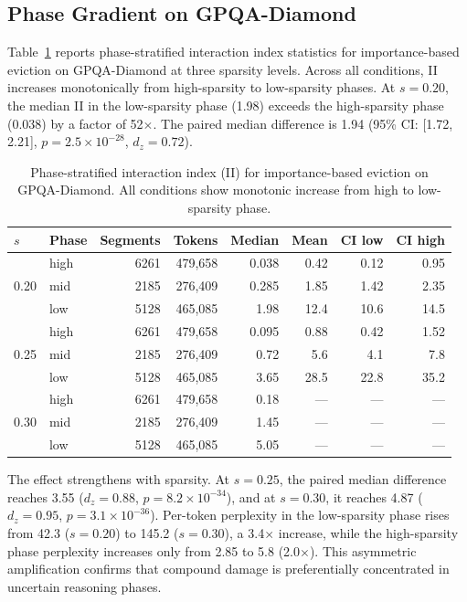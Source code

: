 \documentclass[11pt,a4paper]{article}
\begin{document}
\subsection{Phase Gradient on GPQA-Diamond}\label{sec:phase-gradient}

Table~\ref{tab:gpqa-phase} reports phase-stratified interaction index statistics for importance-based eviction on GPQA-Diamond at three sparsity levels. Across all conditions, II increases monotonically from high-sparsity to low-sparsity phases. At $s{=}0.20$, the median II in the low-sparsity phase (1.98) exceeds the high-sparsity phase (0.038) by a factor of 52$\times$. The paired median difference is 1.94 (95\% CI: [1.72, 2.21], $p{=}2.5 \times 10^{-28}$, $d_z{=}0.72$).

\begin{table}[t]
\centering
\caption{Phase-stratified interaction index (II) for importance-based eviction on GPQA-Diamond. All conditions show monotonic increase from high to low-sparsity phase.}
\label{tab:gpqa-phase}
\small
\begin{tabular}{llrrrrrr}
\toprule
$s$ & Phase & Segments & Tokens & Median & Mean & CI low & CI high \\
\midrule
\multirow{3}{*}{0.20} & high & 6261 & 479{,}658 & 0.038 & 0.42 & 0.12 & 0.95 \\
 & mid & 2185 & 276{,}409 & 0.285 & 1.85 & 1.42 & 2.35 \\
 & low & 5128 & 465{,}085 & 1.98 & 12.4 & 10.6 & 14.5 \\
\midrule
\multirow{3}{*}{0.25} & high & 6261 & 479{,}658 & 0.095 & 0.88 & 0.42 & 1.52 \\
 & mid & 2185 & 276{,}409 & 0.72 & 5.6 & 4.1 & 7.8 \\
 & low & 5128 & 465{,}085 & 3.65 & 28.5 & 22.8 & 35.2 \\
\midrule
\multirow{3}{*}{0.30} & high & 6261 & 479{,}658 & 0.18 & --- & --- & --- \\
 & mid & 2185 & 276{,}409 & 1.45 & --- & --- & --- \\
 & low & 5128 & 465{,}085 & 5.05 & --- & --- & --- \\
\bottomrule
\end{tabular}
\end{table}

The effect strengthens with sparsity. At $s{=}0.25$, the paired median difference reaches 3.55 ($d_z{=}0.88$, $p{=}8.2 \times 10^{-34}$), and at $s{=}0.30$, it reaches 4.87 ($d_z{=}0.95$, $p{=}3.1 \times 10^{-36}$). Per-token perplexity in the low-sparsity phase rises from 42.3 ($s{=}0.20$) to 145.2 ($s{=}0.30$), a 3.4$\times$ increase, while the high-sparsity phase perplexity increases only from 2.85 to 5.8 (2.0$\times$). This asymmetric amplification confirms that compound damage is preferentially concentrated in uncertain reasoning phases.
\end{document}
